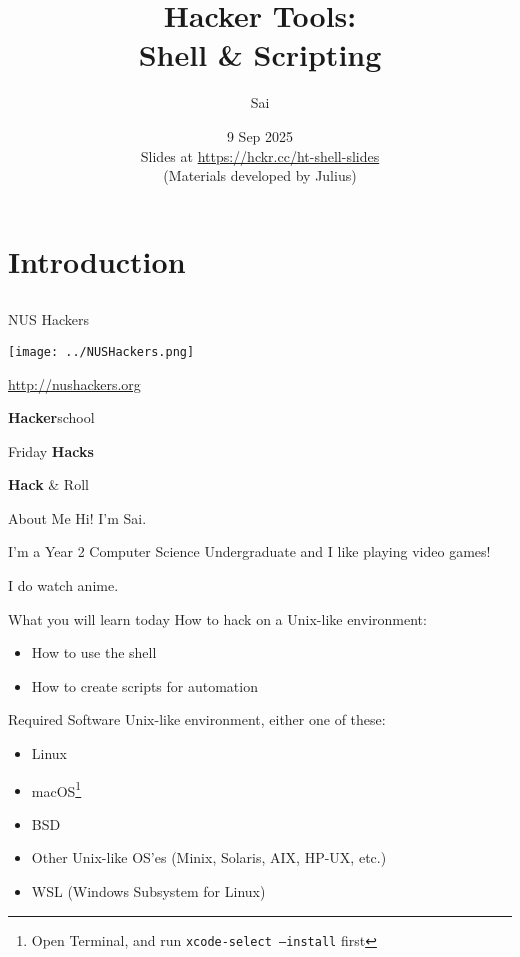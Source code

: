 \documentclass[12pt]{beamer}
\title{Hacker Tools: \\Shell \& Scripting}
\author{Sai}
\date{9 Sep 2025 \\ Slides at \url{https://hckr.cc/ht-shell-slides} \\ (Materials developed by Julius)}
\begin{document}
\frame[plain]{\titlepage}

\section{Introduction}
\subsection{}

\begin{frame}{NUS Hackers}

  \begin{center}
    \texttt{[image: ../NUSHackers.png]}

    \url{http://nushackers.org}
  \end{center}

  \begin{center}
    \textbf{Hacker}school

    Friday \textbf{Hacks}

    \textbf{Hack} \& Roll
  \end{center}

\end{frame}

\begin{frame}{About Me}
  Hi! I'm Sai.

  I'm a Year 2 Computer Science Undergraduate and I like playing video games!

  I do watch anime.

\end{frame}

\begin{frame}{What you will learn today}
  How to hack on a Unix-like environment:
  \begin{itemize}
    \item How to use the shell
    \item How to create scripts for automation
  \end{itemize}
\end{frame}

\begin{frame}{Required Software}
  Unix-like environment, either one of these:
  \begin{itemize}
    \item Linux
    \item macOS\footnote{Open Terminal, and run \texttt{xcode-select --install} first}
    \item BSD
    \item Other Unix-like OS'es (Minix, Solaris, AIX, HP-UX, etc.)
    \item WSL (Windows Subsystem for Linux)
  \end{itemize}
\end{frame}
\end{document}
